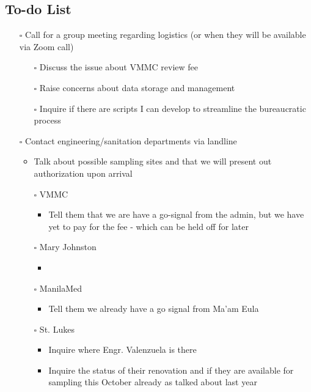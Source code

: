 \documentclass[11pt]{report}
\newcommand{\pending}{$\square$}  %
\begin{document}
\subsection{To-do List}
\begin{itemize}
	\item [\pending] Call for a group meeting regarding logistics (or when they will be available via Zoom call)
	
	\begin{itemize}
		\item [\pending] Discuss the issue about VMMC review fee
		\item [\pending] Raise concerns about data storage and management
		\item [\pending] Inquire if there are scripts I can develop to streamline the bureaucratic process
	
	\end{itemize}
	\item [\pending] Contact engineering/sanitation departments via landline
	\begin{itemize}
		\item Talk about possible sampling sites and that we will present out authorization upon arrival
	\end{itemize}
	\begin{itemize}
		\item [\pending] VMMC 
			\begin{itemize}
				\item Tell them that we are have a go-signal from the admin, but we have yet to pay for the fee - which can be held off for later
			\end{itemize}
		\item [\pending] Mary Johnston
			\begin{itemize}
				\item 
			\end{itemize}
		\item [\pending] ManilaMed 
				\begin{itemize}
				\item Tell them we already have a go signal from Ma'am Eula
			\end{itemize}
		\item [\pending] St. Lukes
			\begin{itemize}
				\item Inquire where Engr. Valenzuela is there
				\item Inquire the status of their renovation and if they are available for sampling this October already as talked about last year
			\end{itemize}
	\end{itemize}
		
\end{itemize}
\end{document}
